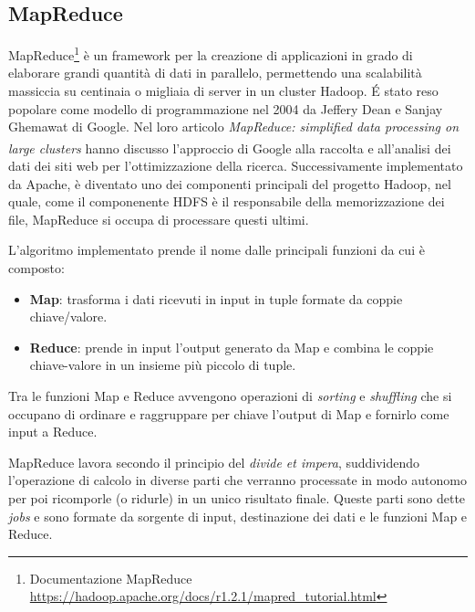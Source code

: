 \subsection{MapReduce}
MapReduce\footnote{Documentazione MapReduce \href{https://hadoop.apache.org/docs/r1.2.1/mapred\_tutorial.html}{https://hadoop.apache.org/docs/r1.2.1/mapred\_tutorial.html}} è un framework per la creazione di applicazioni in grado di elaborare grandi quantità di dati in parallelo, permettendo una scalabilità massiccia su centinaia o migliaia di server in un cluster Hadoop. É stato reso popolare come modello di programmazione nel 2004 da Jeffery Dean e Sanjay Ghemawat di Google. Nel loro articolo \textit{MapReduce: simplified data processing on large clusters}\textsuperscript{\cite{pub62_mapreduce}} hanno discusso l'approccio di Google alla raccolta e all'analisi dei dati dei siti web per l'ottimizzazione della ricerca. Successivamente implementato da Apache, è diventato uno dei componenti principali del progetto Hadoop, nel quale, come il componenente HDFS è il responsabile della memorizzazione dei file, MapReduce si occupa di processare questi ultimi.

L'algoritmo implementato prende il nome dalle principali funzioni da cui è composto:
\begin{itemize}
    \item \textbf{Map}: trasforma i dati ricevuti in input in tuple formate da coppie chiave/valore.
    \item \textbf{Reduce}: prende in input l'output generato da Map e combina le coppie chiave-valore in un insieme più piccolo di tuple.
\end{itemize}
Tra le funzioni Map e Reduce avvengono operazioni di \textit{sorting} e \textit{shuffling} che si occupano di ordinare e raggruppare per chiave l'output di Map e fornirlo come input a Reduce.

MapReduce lavora secondo il principio del \textit{divide et impera}, suddividendo l'operazione di calcolo in diverse parti che verranno processate in modo autonomo per poi ricomporle (o ridurle) in un unico risultato finale. Queste parti sono dette \textit{jobs} e sono formate da sorgente di input, destinazione dei dati e le funzioni Map e Reduce.

